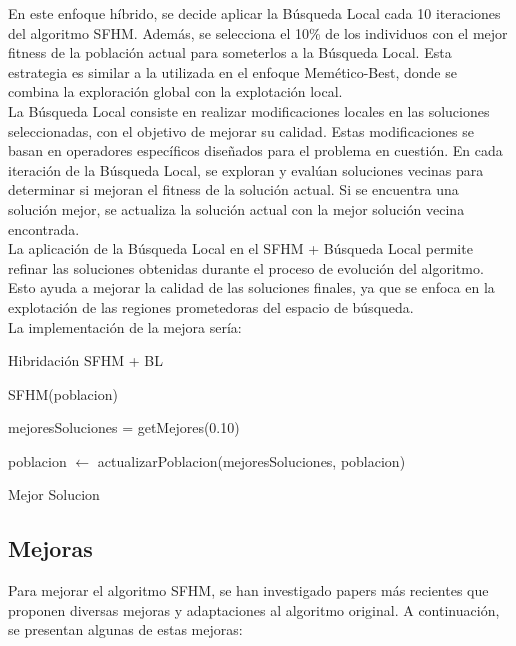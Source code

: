 En este enfoque híbrido, se decide aplicar la Búsqueda Local cada 10 iteraciones del algoritmo SFHM. Además, se selecciona el 10\% de los individuos con el mejor fitness de la población actual para someterlos a la Búsqueda Local. Esta estrategia es similar a la utilizada en el enfoque Memético-Best, donde se combina la exploración global con la explotación local.\\

La Búsqueda Local consiste en realizar modificaciones locales en las soluciones seleccionadas, con el objetivo de mejorar su calidad. Estas modificaciones se basan en operadores específicos diseñados para el problema en cuestión. En cada iteración de la Búsqueda Local, se exploran y evalúan soluciones vecinas para determinar si mejoran el fitness de la solución actual. Si se encuentra una solución mejor, se actualiza la solución actual con la mejor solución vecina encontrada.\\

La aplicación de la Búsqueda Local en el SFHM + Búsqueda Local permite refinar las soluciones obtenidas durante el proceso de evolución del algoritmo. Esto ayuda a mejorar la calidad de las soluciones finales, ya que se enfoca en la explotación de las regiones prometedoras del espacio de búsqueda.\\

La implementación de la mejora sería:

\begin{algorithm}[H]
	\caption{Hibridación SFHM + BL}
	
	
	\BlankLine
	
	SFHM(poblacion)\;
	
	mejoresSoluciones = getMejores(0.10) \;
	
	poblacion $\leftarrow$ actualizarPoblacion(mejoresSoluciones, poblacion)\;
	
	\BlankLine
	\Return Mejor Solucion\;
\end{algorithm}


\subsection{Mejoras}

Para mejorar el algoritmo SFHM, se han investigado papers más recientes que proponen diversas mejoras y adaptaciones al algoritmo original. A continuación, se presentan algunas de estas mejoras:

